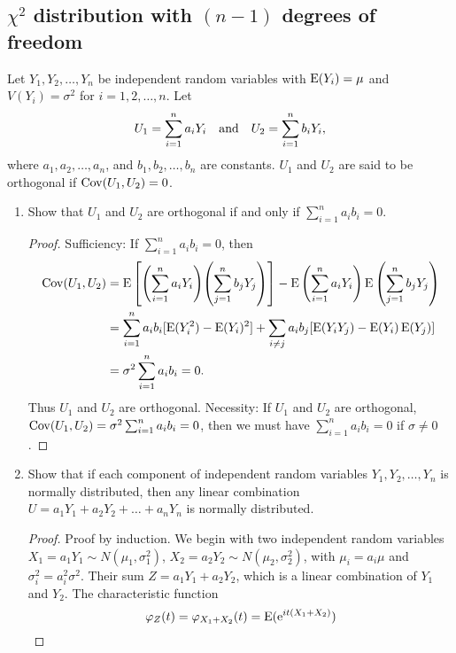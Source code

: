 \documentclass[10pt]{article}
\begin{document}
	\subsection{$\chi^2$ distribution with $(n-1)$ degrees of freedom}

	Let $Y_1, Y_2, \dots, Y_n$ be independent random variables with $\operatorname{E}(Y_i) = \mu$ and $V(Y_i) = \sigma^2$ for $i = 1,2,\dots,n$. Let
	\begin{equation}
		U_1 = \sum_{i = 1}^n a_i Y_i \qand U_2 = \sum_{i=1}^n b_i Y_i,
	\end{equation}
	where $a_1, a_2, \dots, a_n$, and $b_1, b_2, \dots, b_n$ are constants. $U_1$ and $U_2$ are said to be orthogonal if $\operatorname{Cov}(U_1, U_2) = 0$.

	\begin{enumerate}
		\item Show that $U_1$ and $U_2$ are orthogonal if and only if $\sum_{i=1}^n a_i b_i = 0$.
		\begin{proof}
			Sufficiency: If $\sum_{i=1}^n a_i b_i = 0$, then
			\begin{align*}
				\Cov(U_1, U_2) &= \E\bqty{\qty(\sum_{i = 1}^n a_i Y_i)\qty(\sum_{j=1}^n b_j Y_j)} - \E\qty(\sum_{i = 1}^n a_i Y_i) \E\qty(\sum_{j=1}^n b_j Y_j) \\
				&= \sum_{i=1}^n a_i b_i [\E(Y_i^2) - \E(Y_i)^2] + \sum_{i \neq j} a_i b_j [\E(Y_i Y_j) - \E(Y_i) \E(Y_j)] \\
				&= \sigma^2 \sum_{i=1}^n a_i b_i = 0.
			\end{align*}
			Thus $U_1$ and $U_2$ are orthogonal.
			Necessity: If $U_1$ and $U_2$ are orthogonal, $\operatorname{Cov}(U_1, U_2) = \sigma^2 \sum_{i=1}^n a_i b_i = 0$, then we must have $\sum_{i=1}^n a_i b_i = 0$ if $\sigma \neq 0$.
		\end{proof}
		\item Show that if each component of independent random variables $Y_1, Y_2, \dots, Y_n$ is normally distributed, then any linear combination $U = a_1 Y_1 + a_2 Y_2 + \dots + a_n Y_n$ is normally distributed.
		\begin{proof}
			Proof by induction. We begin with two independent random variables $X_1 = a_1 Y_1 \sim N(\mu_1, \sigma_1^2)$, $X_2 = a_2 Y_2 \sim N(\mu_2, \sigma_2^2)$, with $\mu_i = a_i \mu$ and $\sigma_i^2 = a_i^2 \sigma^2$. Their sum $Z = a_1 Y_1 + a_2 Y_2$, which is a linear combination of $Y_1$ and $Y_2$.
			The characteristic function
			\begin{equation}
				\varphi_Z(t) = \varphi_{X_1 + X_2}(t) = \operatorname{E}({\mathrm{e}}^{i t (X_1 + X_2)})
			\end{equation}

\end{proof}
\end{enumerate}
\end{document}
